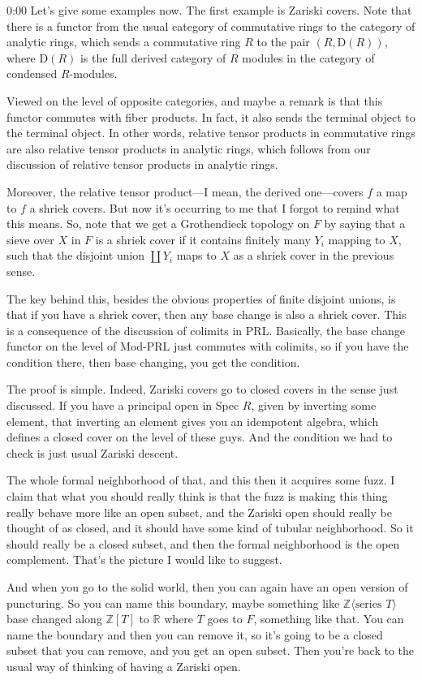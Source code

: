 \begin{unfinished}{0:00}
Let's give some examples now. The first example is Zariski covers. Note that there is a functor from the usual category of commutative rings to the category of analytic rings, which sends a commutative ring $R$ to the pair $(R, \mathrm{D}(R))$, where $\mathrm{D}(R)$ is the full derived category of $R$ modules in the category of condensed $R$-modules.

Viewed on the level of opposite categories, and maybe a remark is that this functor commutes with fiber products. In fact, it also sends the terminal object to the terminal object. In other words, relative tensor products in commutative rings are also relative tensor products in analytic rings, which follows from our discussion of relative tensor products in analytic rings. 

Moreover, the relative tensor product---I mean, the derived one---covers $f$ a map to $f$ a shriek covers. But now it's occurring to me that I forgot to remind what this means. So, note that we get a Grothendieck topology on $F$ by saying that a sieve over $X$ in $F$ is a shriek cover if it contains finitely many $Y_i$ mapping to $X$, such that the disjoint union $\coprod Y_i$ maps to $X$ as a shriek cover in the previous sense.

The key behind this, besides the obvious properties of finite disjoint unions, is that if you have a shriek cover, then any base change is also a shriek cover. This is a consequence of the discussion of colimits in PRL. Basically, the base change functor on the level of Mod-PRL just commutes with colimits, so if you have the condition there, then base changing, you get the condition. 

The proof is simple. Indeed, Zariski covers go to closed covers in the sense just discussed. If you have a principal open in Spec $R$, given by inverting some element, that inverting an element gives you an idempotent algebra, which defines a closed cover on the level of these guys. And the condition we had to check is just usual Zariski descent.


The whole formal neighborhood of that, and this then it acquires some fuzz. I claim that what you should really think is that the fuzz is making this thing really behave more like an open subset, and the Zariski open should really be thought of as closed, and it should have some kind of tubular neighborhood. So it should really be a closed subset, and then the formal neighborhood is the open complement. That's the picture I would like to suggest.

And when you go to the solid world, then you can again have an open version of puncturing. So you can name this boundary, maybe something like $\mathbb{Z}\langle\text{series } T\rangle$ base changed along $\mathbb{Z}[T]$ to $\mathbb{R}$ where $T$ goes to $F$, something like that. You can name the boundary and then you can remove it, so it's going to be a closed subset that you can remove, and you get an open subset. Then you're back to the usual way of thinking of having a Zariski open.


\end{unfinished}
